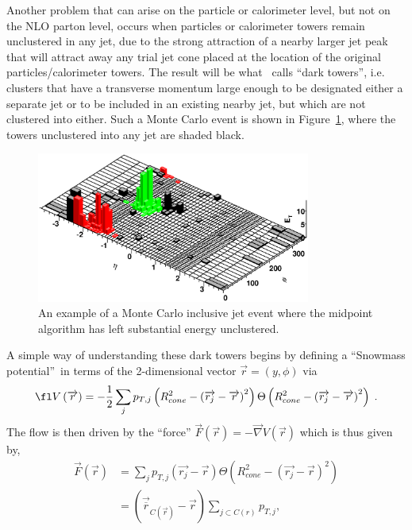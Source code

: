 \documentclass[12pt]{iopart}
\begin{document}
Another problem that can arise on the particle or calorimeter level, but not on the  NLO parton level, occurs when particles or
calorimeter towers remain unclustered in  any jet, due to the strong attraction of a nearby larger jet peak that will attract away  any
trial jet cone placed at the location of the original particles/calorimeter towers.  The result will be what~\cite{Ellis:2001aa}
calls ``dark towers'', i.e. clusters that have a transverse  momentum large  enough to be designated either a separate jet or to be
included in an existing  nearby jet, but which are not clustered into  either. Such a Monte Carlo event is shown in 
Figure~\ref{fig:dark_towers}, where the towers unclustered  into any jet are shaded black. 
%
\begin{figure}[t]
\begin{center}
\includegraphics[width=9cm]{P5_ellis_0704_fig5.eps}
\end{center}
\vspace*{-0.5cm}
\caption{
An example of a Monte Carlo inclusive jet event where the midpoint algorithm has left substantial energy unclustered.
\label{fig:dark_towers}}
\end{figure}
%
A simple way of understanding these dark towers begins by defining
a \textquotedblleft Snowmass potential\textquotedblright\ in terms of the 2-dimensional vector
$\overrightarrow{r}=\left(  y,\phi\right)  $ via
%
\begin{equation}
\fl
V\left(  \overrightarrow{r}\right)  =-\frac{1}{2}\sum_{j}p_{T,j}\left(
R_{cone}^{2}-\left(  \overrightarrow{r_j}-\overrightarrow{r}\right)
^{2}\right)  \Theta\left(  R_{cone}^{2}-\left(  \overrightarrow{r_j}
-\overrightarrow{r}\right)^{2}\right) \; .
\end{equation}
%
The flow is then driven by the \textquotedblleft force\textquotedblright
$\overrightarrow{F}\left(  \overrightarrow{r}\right)  =-\overrightarrow
{\nabla}V\left(  \overrightarrow{r}\right)$
which is thus given by,
%
\begin{eqnarray}
\overrightarrow{F}\left(  \overrightarrow{r}\right) &=\sum_{j}p_{T,j} \left(\overrightarrow{r_j}-\overrightarrow{r}\right)
 \Theta\left(  R_{cone}^{2}-\left(  \overrightarrow{r_j}-\overrightarrow{r}\right)^{2}\right) \nonumber \\
  &=\left(  \overrightarrow{\overline{r}}_{C\left( \overrightarrow{r}\right) }-\overrightarrow{r}\right)
  \sum_{j\subset C\left(  r \right)  }p_{T,j},
\end{eqnarray}
\end{document}
